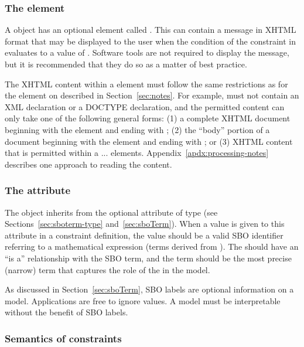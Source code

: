 \subsubsection{The  element}
\label{sec:constraint-message}

A \Constraint object has an optional element called
.  This can contain a message in XHTML format that
may be displayed to the user when the condition of the constraint
in  evaluates to a value of .  Software
tools are not required to display the message, but it is
recommended that they do so as a matter of best practice.

The XHTML content within a  element must follow the
same restrictions as for the  element on \SBase
described in Section~\ref{sec:notes}.  For example,
 must not contain an XML declaration or a DOCTYPE
declaration, and the permitted content can only take one of the
following general forms: (1) a complete XHTML document beginning
with the element  and ending with ;
(2) the ``body'' portion of a document beginning with the element
 and ending with ; or (3) XHTML
content that is permitted within a  ...
 elements.    Appendix~\ref{apdx:processing-notes}
describes one approach to reading the  content.


\subsubsection{The  attribute}
\label{sec:constraint-sboterm}

The \Constraint object inherits from \SBase the optional  attribute of
type  (see Sections~\ref{sec:sboterm-type}
and~\ref{sec:sboTerm}).  When a value is given to this attribute in a
constraint definition, the value should be a valid SBO identifier
referring to a mathematical expression (\ie terms derived from
\sbomathformula).  The \Constraint should have an ``is a''
relationship with the SBO term, and the term should be the most
precise (narrow) term that captures the role of the \Constraint in
the model.

As discussed in Section~\ref{sec:sboTerm}, SBO labels are optional
information on a model.  Applications are free to ignore
 values.  A model must be interpretable without the
benefit of SBO labels.


\subsubsection{Semantics of constraints}
\label{sec:constraint-semantics}

